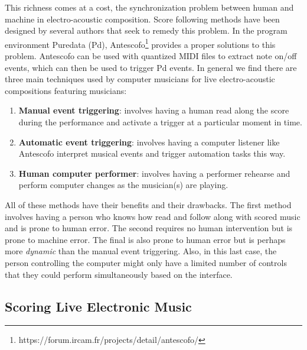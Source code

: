 This richness comes at a cost, the synchronization problem between human and machine in electro-acoustic composition. Score following methods have been designed by several authors that seek to remedy this problem. In the program environment Puredata (Pd), Antescofo\footnote{https://forum.ircam.fr/projects/detail/antescofo/} provides a proper solutions to this problem. Antescofo can be used with quantized MIDI files to extract note on/off events, which can then be used to trigger Pd events. In general we find there are three main techniques used by computer musicians for live electro-acoustic compositions featuring musicians:

\begin{enumerate}
    \item \textbf{Manual event triggering}: involves having a human read along the score during the performance and activate a trigger at a particular moment in time.  
    \item \textbf{Automatic event triggering}: involves having a computer listener like Antescofo interpret musical events and trigger automation tasks this way. 
    \item \textbf{Human computer performer}: involves having a performer rehearse and perform computer changes as the musician(s) are playing. 
\end{enumerate}

All of these methods have their benefits and their drawbacks. The first method involves having a person who knows how read and follow along with scored music and is prone to human error. The second requires no human intervention but is prone to machine error. The final is also prone to human error but is perhaps more \textit{dynamic} than the manual event triggering. Also, in this last case, the person controlling the computer might only have a limited number of controls that they could perform simultaneously based on the interface. 

\subsection{Scoring Live Electronic Music}


